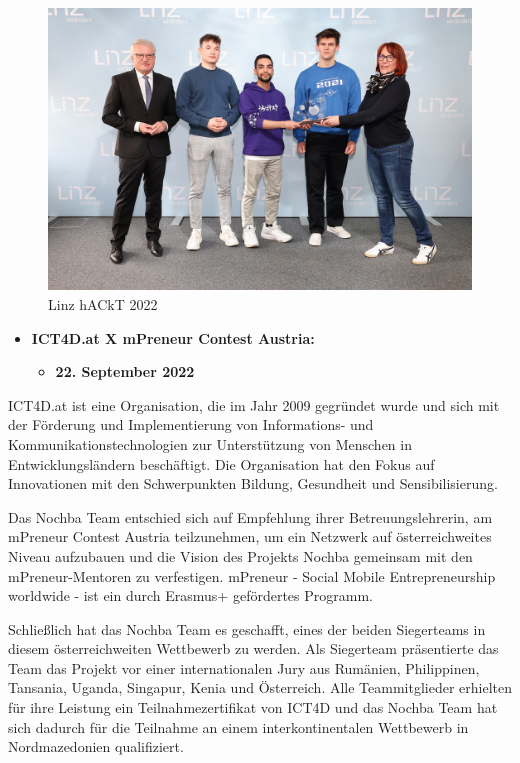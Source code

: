 \begin{figure}[H]
    \centering
    \includegraphics[width=1\textwidth]{pics/Linz-hACkT-2022.jpg}
    \caption{Linz hACkT 2022}
    \label{fig:linz-hackt}
\end{figure}


\begin{itemize}
    \item \textbf{ICT4D.at X mPreneur Contest Austria:}
          \begin{itemize}
              \item \textbf{22. September 2022}
          \end{itemize}
\end{itemize}


ICT4D.at ist eine Organisation, die im Jahr 2009 gegründet wurde und sich mit der Förderung und Implementierung von Informations- und Kommunikationstechnologien zur Unterstützung von Menschen in Entwicklungsländern beschäftigt. Die Organisation hat den Fokus auf Innovationen mit den Schwerpunkten Bildung, Gesundheit und Sensibilisierung.

Das Nochba Team entschied sich auf Empfehlung ihrer Betreuungslehrerin, am mPreneur Contest Austria teilzunehmen, um ein Netzwerk auf österreichweites Niveau aufzubauen und die Vision des Projekts Nochba gemeinsam mit den mPreneur-Mentoren zu verfestigen. mPreneur - Social Mobile Entrepreneurship worldwide - ist ein durch Erasmus+ gefördertes Programm.

Schließlich hat das Nochba Team es geschafft, eines der beiden Siegerteams in diesem österreichweiten Wettbewerb zu werden. Als Siegerteam präsentierte das Team das Projekt vor einer internationalen Jury aus Rumänien, Philippinen, Tansania, Uganda, Singapur, Kenia und Österreich. Alle Teammitglieder erhielten für ihre Leistung ein Teilnahmezertifikat von ICT4D und das Nochba Team hat sich dadurch für die Teilnahme an einem interkontinentalen Wettbewerb in Nordmazedonien qualifiziert.

